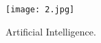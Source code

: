 \documentclass[10pt,twocolumn,letterpaper]{article}
\begin{document}
\begin{figure}[!htb]
\begin{center}
   \texttt{[image: 2.jpg]}
\end{center}
   \caption{Artificial Intelligence.}
\label{fig:twocol}
\end{figure}

{\small


}
\end{document}
